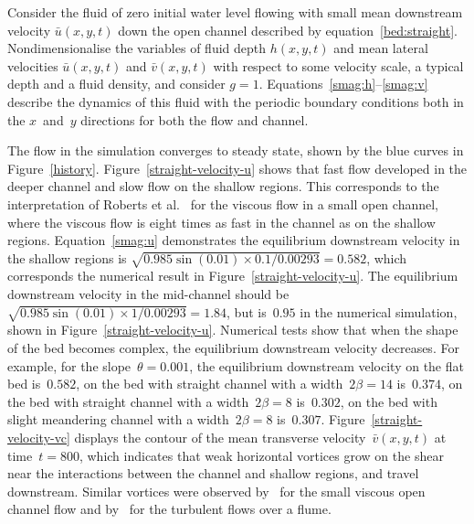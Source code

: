 \documentclass[a5paper,12pt]{article}
\newcommand{\uu}{{\bar u}}
\newcommand{\vv}{{\bar v}}
\begin{document}
Consider the fluid of zero initial water level flowing with small mean downstream velocity $\uu(x,y,t)$ down the open channel described by equation~\eqref{bed:straight}. 
Nondimensionalise the variables of fluid depth $h(x,y,t)$ and mean lateral velocities $\uu(x,y,t)$ and $\vv(x,y,t)$ with respect to some velocity scale, a typical depth and a fluid density, and consider $g=1$. 
Equations~\eqref{smag:h}--\eqref{smag:v} describe the dynamics of this fluid with the periodic boundary conditions both in the $x$~and~$y$ directions for both the flow and channel. 

The flow in the simulation converges to steady state, shown by the blue curves in Figure~\ref{history}.
Figure~\ref{straight-velocity-u} shows that fast flow developed in the deeper channel and slow flow on the shallow regions.
This corresponds to the interpretation of Roberts et al.~\cite{Robertsli2006} for the viscous flow in a small open channel, where the viscous flow is eight times as fast in the channel as on the shallow regions. 
Equation~\eqref{smag:u} demonstrates the equilibrium downstream velocity in the shallow regions is $\sqrt{0.985\sin(0.01)\times0.1/0.00293}=0.582$, which corresponds the numerical result in Figure~\ref{straight-velocity-u}. 
The equilibrium downstream velocity in the mid-channel should be $\sqrt{0.985\sin(0.01)\times1/0.00293}=1.84$, but is~$0.95$ in the numerical simulation, shown in Figure~\ref{straight-velocity-u}. 
Numerical tests show that when the shape of the bed becomes complex, the equilibrium downstream velocity decreases. 
For example, for the slope~$\theta=0.001$, the equilibrium downstream velocity on the flat bed is~$0.582$, on the bed with straight channel with a width~$2\beta=14$ is~$0.374$, on the bed with straight channel with a width~$2\beta=8$ is~$0.302$, on the bed with slight meandering channel with a width~$2\beta=8$ is~$0.307$.
Figure~\ref{straight-velocity-vc} displays the contour of the mean transverse velocity~$\vv(x,y,t)$ at time~$t=800$, which indicates that weak horizontal vortices grow on the shear near the interactions between the channel and shallow regions, and travel downstream. 
Similar vortices were observed by~\cite{Robertsli2006} for the small viscous open channel flow and by~\cite{Bousmar2003a} for the turbulent flows over a flume. 
\end{document}
